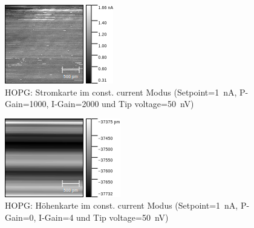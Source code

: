 \documentclass[sn-mathphys-num,iicol]{sn-jnl}
\theoremstyle{thmstyleone}
\theoremstyle{thmstyletwo}
\theoremstyle{thmstylethree}
\begin{document}
\begin{figure}[h]
        \centering
        \includegraphics[width=.5\textwidth]{../data/Graphit7_current.png}
        \caption{HOPG: Stromkarte im const. current Modus (Setpoint=\SI{1}{\nano A}, P-Gain=\SI{1000}{}, I-Gain=\SI{2000}{} und Tip voltage=\SI{50}{\nano V})} \label{fig:gr2nm50nVc3}
\end{figure}
\begin{figure}[h]
        \centering
        \includegraphics[width=.5\textwidth]{../data/Graphit7_z.png}
        \caption{HOPG: Höhenkarte im const. current Modus (Setpoint=\SI{1}{\nano A}, P-Gain=\SI{0}{}, I-Gain=\SI{4}{} und Tip voltage=\SI{50}{\nano V})} \label{fig:gr2nm50nVz3}
\end{figure}
\end{document}
